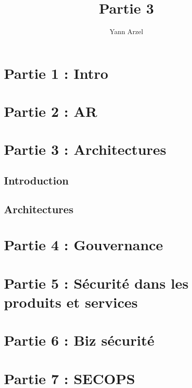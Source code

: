 \documentclass{book}
\begin{document}
\title{Partie 3}
\author{Yann Arzel}

\maketitle



\part{Partie 1 : Intro} %

\part{Partie 2 : AR} %

\part{Partie 3 : Architectures} %

\chapter{Introduction}




\chapter{Architectures}





\part{Partie 4 : Gouvernance} %



\part{Partie 5 : Sécurité dans les produits et services} %







\part{Partie 6 : Biz sécurité} %
\part{Partie 7 : SECOPS} %
\end{document}
